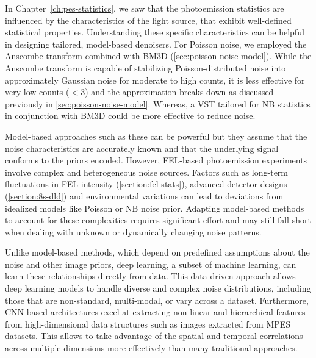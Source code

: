 In Chapter~\ref{ch:pes-statistics}, we saw that the photoemission statistics are influenced by the characteristics of the light source, that exhibit well-defined statistical properties. Understanding these specific characteristics can be helpful in designing tailored, model-based denoisers. For Poisson noise, we employed the Anscombe transform combined with \gls{BM3D} (\cref{sec:poisson-noise-model}). While the Anscombe transform is capable of stabilizing Poisson-distributed noise into approximately Gaussian noise for moderate to high counts, it is less effective for very low counts ($<3$) and the approximation breaks down as discussed previously in \cref{sec:poisson-noise-model}. Whereas, a \gls{VST} tailored for \gls{NB} statistics in conjunction with \gls{BM3D} could be more effective to reduce noise.

Model-based approaches such as these can be powerful but they assume that the noise characteristics are accurately known and that the underlying signal conforms to the priors encoded. However, \gls{FEL}-based photoemission experiments involve complex and heterogeneous noise sources. Factors such as long-term fluctuations in \gls{FEL} intensity (\cref{section:fel-stats}), advanced detector designs (\cref{section:8s-dld}) and environmental variations can lead to deviations from idealized models like Poisson or \gls{NB} noise prior. Adapting model-based methods to account for these complexities requires significant effort and may still fall short when dealing with unknown or dynamically changing noise patterns.

Unlike model-based methods, which depend on predefined assumptions about the noise and other image priors, deep learning, a subset of machine learning,  can learn these relationships directly from data. This data-driven approach allows deep  learning models to handle diverse and complex noise distributions, including those that are non-standard, multi-modal, or vary across a dataset. Furthermore, \gls{CNN}-based architectures excel at extracting non-linear and hierarchical features from  high-dimensional data structures such as images extracted from \gls{MPES} datasets. This allows to take advantage of the spatial and temporal correlations across multiple dimensions more effectively than many traditional approaches.


